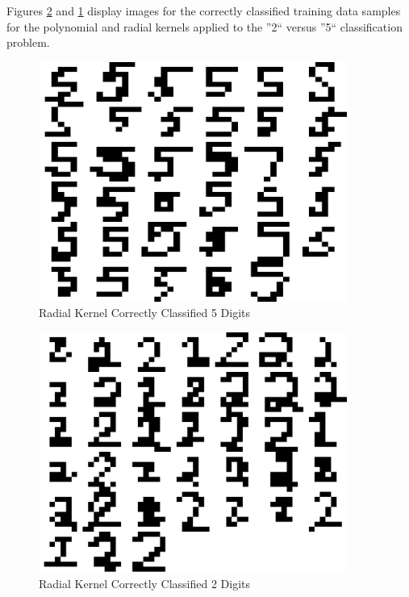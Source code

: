 \documentclass{article}
\begin{document}
Figures \ref{radial2correcttest} and \ref{radial5correcttest} display images for the correctly classified training data samples for the polynomial and radial kernels applied to the ''2`` versus ''5`` classification problem.

\begin{figure}
\centering
\includegraphics[width=0.9\textwidth]{images/test2_5_correct5_radial.png}
\caption{Radial Kernel Correctly Classified 5 Digits}
\label{radial5correcttest}
\end{figure}

\begin{figure}
\centering
\includegraphics[width=0.9\textwidth]{images/test2_5_correct2_radial.png}
\caption{Radial Kernel Correctly Classified 2 Digits}
\label{radial2correcttest}
\end{figure}
\end{document}
